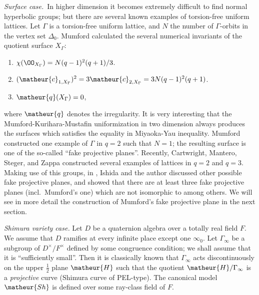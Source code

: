 {\it Surface case.}\ 
In higher dimension it becomes extremely difficult to find normal
hyperbolic groups; but there are several known examples of torsion-free
uniform lattices.
Let $\Gamma$ is a torsion-free uniform lattice, and $N$ the number of
$\Gamma$-orbits in the vertex set $\Delta_0$.
Mumford \cite{aaswkak9pq0} calculated the several numerical invariants of the
quotient surface $X_{\Gamma}$:
\begin{enumerate}
\item $\chi(\OO_{X_{\Gamma}})=N(q-1)^2(q+1)/3$.
\item $(\matheur{c}_{1,X_{\Gamma}})^2=3\matheur{c}_{2,X_{\Gamma}}=
3N(q-1)^2(q+1)$.
\item $\matheur{q}(X_{\Gamma})=0$,
\end{enumerate}
where $\matheur{q}$ denotes the irregularity.
It is very interesting that the Mumford-Kurihara-Mustafin uniformization 
in two dimension always produces the surfaces which satisfies
the equality in Miyaoka-Yau inequality.
Mumford \cite{aaswkak9pq0} constructed one example of $\Gamma$ in $q=2$ such
that $N=1$; the resulting surface is one of the so-called ``fake
projective planes''.
Recently, Cartwright, Mantero, Steger, and Zappa constructed several
examples of lattices in $q=2$ and $q=3$. 
Making use of this groups, in \cite{tsrtfnu}, Ishida and the author
discussed other possible fake projective planes, and showed that there
are at least three fake projective planes (incl.\ Mumford's one) which
are not isomorphic to among others.
We will see in more detail the construction of Mumford's fake projective
plane in the next section.

\vspace{1ex}
{\it Shimura variety case.}
Let $D$ be a quaternion algebra over a totally real field $F$.
We assume that $D$ ramifies at every infinite place except one $\infty_0$.
Let $\Gamma_{\infty}$ be a subgroup of $D^{\times}/F^{\times}$ defined
by some congruence condition; we shall assume that it is ``sufficiently
small''.
Then it is classically known that $\Gamma_{\infty}$ acts discontinuously 
on the upper $\frac{1}{2}$ plane $\matheur{H}$ such that the quotient
$\matheur{H}/\Gamma_{\infty}$ is a {\it projective} curve (Shimura curve
of PEL-type).
The canonical model $\matheur{Sh}$ is defined over some ray-class field
of $F$.

